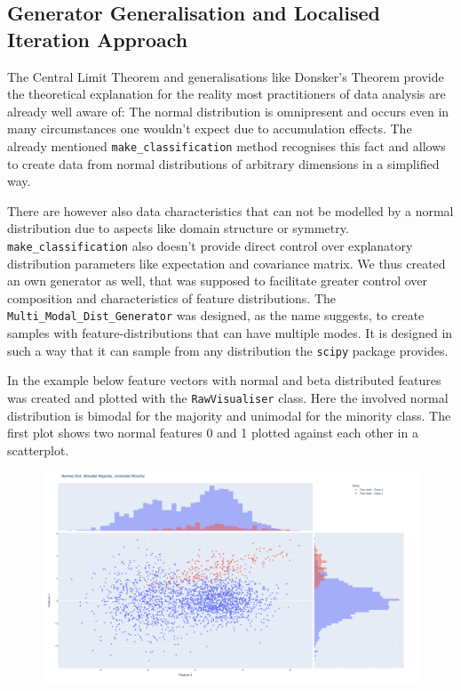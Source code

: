 \subsection{Generator Generalisation and Localised Iteration Approach}

The Central Limit Theorem and generalisations like Donsker's Theorem provide the theoretical explanation for the reality most practitioners
of data analysis are already well aware of: The normal distribution is omnipresent and occurs even in many circumstances one wouldn't expect due to accumulation effects.
The already mentioned \texttt{make\_classification} method recognises this fact and allows to create data from normal distributions of arbitrary dimensions in a simplified way.

There are however also data characteristics that can not be modelled by a normal distribution due to aspects like domain structure or symmetry.
\texttt{make\_classification} also doesn't provide direct control over explanatory distribution parameters like expectation and covariance matrix.
We thus created an own generator as well, that was supposed to facilitate greater control over composition and characteristics of feature distributions.
The \texttt{Multi\_Modal\_Dist\_Generator} was designed, as the name suggests, to create samples with feature-distributions that can have multiple modes.
It is designed in such a way that it can sample from any distribution the \texttt{scipy} package provides.

In the example below feature vectors with normal and beta distributed features was created and plotted with the \texttt{RawVisualiser} class.
Here the involved normal distribution is bimodal for the majority and unimodal for the minority class. 
The first plot shows two normal features 0 and 1 plotted against each other in a scatterplot. 

\begin{figure}[H]
	\centering
  	\includegraphics[width=\linewidth]{assets/data_vis/Normal_Dist_Bimodal.png}
  	\label{fig:Bimodal Normal}
\end{figure}

